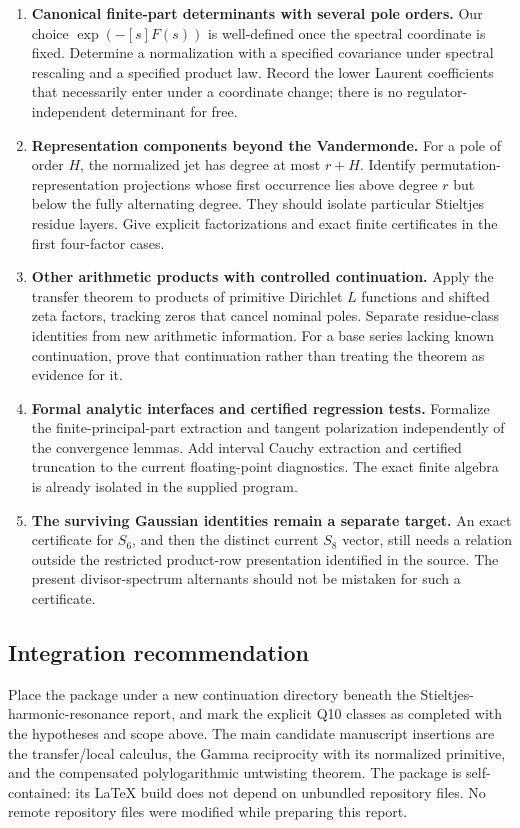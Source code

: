 \begin{enumerate}[leftmargin=*,label=\textbf{Q\arabic*.},itemsep=7pt]
\item \textbf{Canonical finite-part determinants with several pole orders.}
Our choice $\exp(-[s]F(s))$ is well-defined once the spectral coordinate
is fixed. Determine a normalization with a specified covariance under
spectral rescaling and a specified product law. Record the lower
Laurent coefficients that necessarily enter under a coordinate change;
there is no regulator-independent determinant for free.

\item \textbf{Representation components beyond the Vandermonde.}
For a pole of order $H$, the normalized jet has degree at most $r+H$.
Identify permutation-representation projections whose first occurrence
lies above degree $r$ but below the fully alternating degree. They should
isolate particular Stieltjes residue layers. Give explicit factorizations
and exact finite certificates in the first four-factor cases.

\item \textbf{Other arithmetic products with controlled continuation.}
Apply the transfer theorem to products of primitive Dirichlet $L$
functions and shifted zeta factors, tracking zeros that cancel nominal
poles. Separate residue-class identities from new arithmetic information.
For a base series lacking known continuation, prove that continuation
rather than treating the theorem as evidence for it.

\item \textbf{Formal analytic interfaces and certified regression tests.}
Formalize the finite-principal-part extraction and tangent polarization
independently of the convergence lemmas. Add interval Cauchy extraction
and certified truncation to the current floating-point diagnostics.
The exact finite algebra is already isolated in the supplied program.

\item \textbf{The surviving Gaussian identities remain a separate target.}
An exact certificate for $S_6$, and then the distinct current $S_8$
vector, still needs a relation outside the restricted product-row
presentation identified in the source. The present divisor-spectrum
alternants should not be mistaken for such a certificate.
\end{enumerate}

\subsection{Integration recommendation}
Place the package under a new continuation directory beneath the
Stieltjes-harmonic-resonance report, and mark the explicit Q10 classes
as completed with the hypotheses and scope above. The main candidate
manuscript insertions are the transfer/local calculus, the Gamma
reciprocity with its normalized primitive, and the compensated
polylogarithmic untwisting theorem. The package is self-contained:
its \LaTeX{} build does not depend on unbundled repository files.
No remote repository files were modified while preparing this report.

